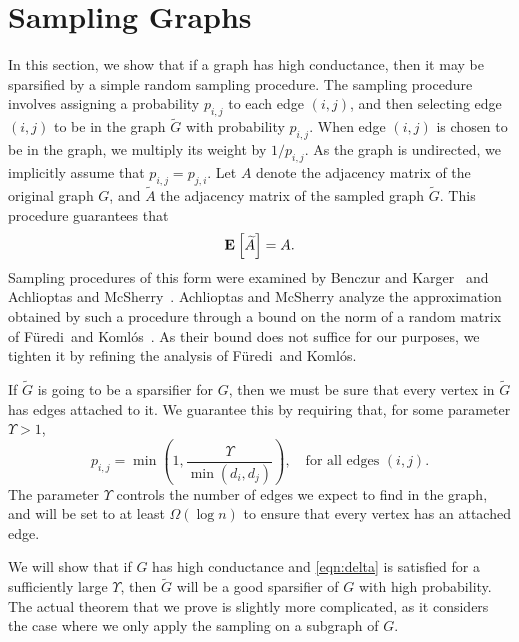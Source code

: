 \documentclass[11pt]{article}
\newcommand{\Furedi}{F{\"u}redi}
\newcommand{\Komlos}{Koml{\'o}s}
\def\Gtil{\widetilde{G}}
\def\Atil{\widetilde{A}}
\def\expec#1#2{\mbox{\bf E}_{#1}\left[ #2 \right]}
\begin{document}
\section{Sampling Graphs}\label{sec:sampling}
In this section, we show that if a graph has high conductance,
  then it may be sparsified by a simple random sampling procedure.
The sampling procedure involves assigning a probability
  $p_{i,j}$ to each edge $(i,j)$, and then selecting edge $(i,j)$ to be
  in the graph $\Gtil$ with probability $p_{i,j}$.
When edge $(i,j)$ is chosen to be in the graph, we multiply its weight by
  $1/p_{i,j}$.
As the graph is undirected, we implicitly assume that $p_{i,j} = p_{j,i}$.
Let $A$ denote the adjacency matrix of the original graph $G$, and $\Atil$
  the adjacency matrix of the sampled graph $\Gtil$.
This procedure guarantees that
\[
  \expec{}{\Atil} = A.
\]
Sampling procedures of this form were examined by Benczur and Karger~\cite{BenczurKarger}
  and Achlioptas and McSherry~\cite{AchlioptasMcSherry}.
Achlioptas and McSherry analyze the approximation obtained by such a procedure
  through a bound on the norm of a random matrix
  of \Furedi \ and \Komlos~\cite{FurediKomlos}.
As their bound does not suffice for our purposes, we tighten it by
  refining the analysis of \Furedi \  and \Komlos.

If $\Gtil$ is going to be a sparsifier for $G$, then we must be sure
  that every vertex in $\Gtil$ has edges attached to it.
We guarantee this by requiring that, for some parameter $\Upsilon > 1$,
\begin{equation}\label{eqn:delta}
  p_{i,j}
  =
\min \left(1, \frac{\Upsilon}{\min (d_{i}, d_{j})} \right) , \quad
\text{for all edges $(i,j)$.}
\end{equation}
The parameter $\Upsilon$ controls the number of edges we expect to find
  in the graph, and will be set to at least $\Omega\left(\log n \right)$
  to ensure that every vertex has an attached edge.

We will show that if $G$ has high conductance and
 \eqref{eqn:delta} is satisfied for a sufficiently large $\Upsilon$,
 then $\Gtil$ will be a good sparsifier of $G$ with high probability.
The actual theorem that we prove is slightly more complicated,
  as it considers the case where we only apply the sampling
  on a subgraph of $G$.
\end{document}
